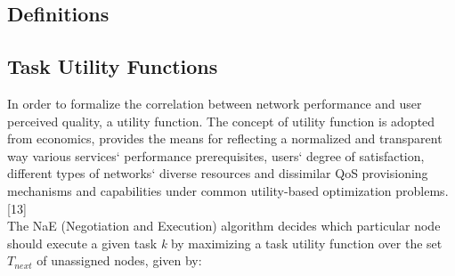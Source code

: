 \documentclass[a4paper]{article}
\begin{document}
\subsection{Definitions}

\subsection{Task Utility Functions}
In order to formalize the correlation between network performance and user perceived quality, a utility function. The concept of utility function is adopted from economics, provides the means for reflecting a normalized and transparent way various services` performance prerequisites, users` degree of satisfaction, different types of networks` diverse resources and dissimilar QoS provisioning mechanisms and capabilities under common utility-based optimization problems. [13] \\ %
The NaE (Negotiation and Execution) algorithm decides which particular node should execute a given task \textit{k} by maximizing a task utility function over the set $T_{next}$ of unassigned nodes, given by:
\end{document}
